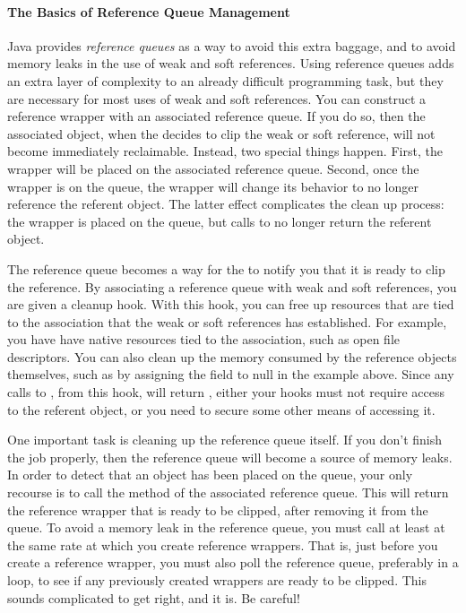 \paragraph{The Basics of Reference Queue Management}
\label{sec:reference-queue-basics}

Java provides \emph{reference queues} as a way to avoid this extra baggage, and
to avoid memory leaks in the use of weak and soft references. Using reference
queues adds an extra layer of complexity to an already difficult programming
task, but they are necessary for most uses of weak and soft references. You can
construct a reference wrapper with an associated reference queue. If you do so,
then the associated object, when the \jre decides to clip the weak or soft
reference, will not become immediately reclaimable. Instead, two special things
happen. First, the wrapper will be placed on the associated reference queue.
Second, once the wrapper is on the queue, the wrapper will change its behavior to
no longer reference the referent object. The latter effect complicates the clean
up process: the wrapper is placed on the queue, but calls to  no longer
return the referent object. 

The reference queue becomes a way for the \jre to notify you that it is ready to
clip the reference.  By associating a reference queue with weak and soft
references, you are given a cleanup hook.
With this hook, you can free up resources that are tied to the association that
the weak or soft references has established. For example, you have have native
resources tied to the association, such as open file descriptors. You can also
clean up the memory consumed by the reference objects themselves, such as by
assigning the  field to null in the example above. Since
any calls to , from this hook, will return , either your
hooks must not require access to the referent object, or you need to secure some
other means of accessing it.

One important task is cleaning up the reference queue itself. If you don't finish
the job properly, then the reference queue will become a source of memory leaks.
In order to detect that an object has been placed on the queue, your only
recourse is to call the  method of the associated reference queue.
This will return the reference wrapper that is ready to be clipped, after
removing it from the queue. To avoid a memory leak in the reference queue, you
must call  at least at the same rate at which you create reference
wrappers. That is, just before you create a reference wrapper, you must also poll
the reference queue, preferably in a loop, to see if any previously created
wrappers are ready to be clipped. This sounds complicated to get right, and it
is. Be careful!

